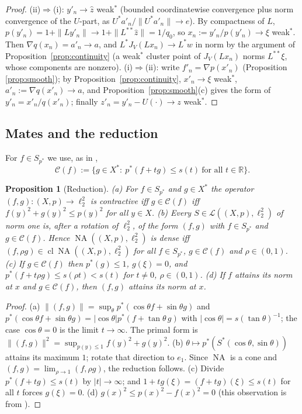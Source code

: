 \documentclass[10pt]{amsart}
\newtheorem{proposition}[theorem]{Proposition}
\theoremstyle{definition}
\theoremstyle{remark}
\newcommand{\NA}{\operatorname{NA}}
\newcommand{\R}{\mathbb R}
\newcommand{\Cset}{\mathcal C}
\newcommand{\cl}{\operatorname{cl}}
\newcommand{\zh}{\hat z}
\begin{document}
\begin{proof}
(ii)$\Rightarrow$(i): $y'_n\to\zh$ weak$^*$ (bounded coordinatewise
convergence plus norm convergence of the $U$-part, as $U^*a'_n/\|U^*a'_n\|\to
e$).  By compactness of $L$, $p(y'_n)=1+\|Ly'_n\|\to1+\|L^{**}\zh\|=1/q_0$,
so $x_n:=y'_n/p(y'_n)\to\xi$ weak$^*$.  Then $\nabla q(x_n)=a'_n\to a$, and
$L^*J_V(Lx_n)\to L^*w$ in norm by the argument of
Proposition~\ref{prop:continuity} (a weak$^*$ cluster point of $J_V(Lx_n)$
norms $L^{**}\xi$, whose components are nonzero).
(i)$\Rightarrow$(ii): write $f'_n=\nabla p(x'_n)$ (Proposition
\ref{prop:smooth}); by Proposition~\ref{prop:continuity}, $x'_n\to\xi$
weak$^*$, $a'_n:=\nabla q(x'_n)\to a$, and Proposition~\ref{prop:smooth}(c)
gives the form of $y'_n=x'_n/q(x'_n)$; finally $z'_n=y'_n-U(\cdot)\to z$
weak$^*$.
\end{proof}

\subsection{Mates and the reduction}
For $f\in S_{p^*}$ we use, as in \cite{PrA},
\[
 \Cset(f):=\{g\in X^*:\ p^*(f+tg)\le s(t)\ \text{for all }t\in\R\}.
\]

\begin{proposition}[Reduction]\label{prop:reduction}
\textup{(a)} For $f\in S_{p^*}$ and $g\in X^*$ the operator
$(f,g):(X,p)\to\ell_2^2$ is contractive iff $g\in\Cset(f)$ iff
$f(y)^2+g(y)^2\le p(y)^2$ for all $y\in X$.
\textup{(b)} Every $S\in\mathcal L((X,p),\ell_2^2)$ of norm one is, after a
rotation of $\ell_2^2$, of the form $(f,g)$ with $f\in S_{p^*}$ and
$g\in\Cset(f)$.  Hence $\NA((X,p),\ell_2^2)$ is dense iff
$(f,\rho g)\in\cl\NA((X,p),\ell_2^2)$ for all $f\in S_{p^*}$,
$g\in\Cset(f)$ and $\rho\in(0,1)$.
\textup{(c)} If $g\in\Cset(f)$ then $p^*(g)\le1$, $g(\xi)=0$, and
$p^*(f+t\rho g)\le s(\rho t)<s(t)$ for $t\ne0$, $\rho\in(0,1)$.
\textup{(d)} If $f$ attains its norm at $x$ and $g\in\Cset(f)$, then
$(f,g)$ attains its norm at $x$.
\end{proposition}

\begin{proof}
(a) $\|(f,g)\|=\sup_\theta p^*(\cos\theta f+\sin\theta g)$ and
$p^*(\cos\theta f+\sin\theta g)=|\cos\theta|p^*(f+\tan\theta\,g)$ with
$|\cos\theta|=s(\tan\theta)^{-1}$; the case $\cos\theta=0$ is the limit
$t\to\infty$.  The primal form is
$\|(f,g)\|^2=\sup_{p(y)\le1}f(y)^2+g(y)^2$.
(b) $\theta\mapsto p^*(S^*(\cos\theta,\sin\theta))$ attains its maximum
$1$; rotate that direction to $e_1$.  Since $\NA$ is a cone and
$(f,g)=\lim_{\rho\to1}(f,\rho g)$, the reduction follows.
(c) Divide $p^*(f+tg)\le s(t)$ by $|t|\to\infty$; and
$1+tg(\xi)=(f+tg)(\xi)\le s(t)$ for all $t$ forces $g(\xi)=0$.
(d) $g(x)^2\le p(x)^2-f(x)^2=0$ (this observation is from \cite{KLMW}).
\end{proof}
\end{document}
